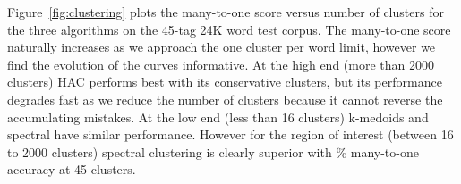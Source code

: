Figure~\ref{fig:clustering} plots the many-to-one score versus number
of clusters for the three algorithms on the 45-tag 24K word test
corpus.  The many-to-one score naturally increases as we approach the
one cluster per word limit, however we find the evolution of the
curves informative.  At the high end (more than 2000 clusters) HAC
performs best with its conservative clusters, but its performance
degrades fast as we reduce the number of clusters because it cannot
reverse the accumulating mistakes.  At the low end (less than 16
clusters) k-medoids and spectral have similar performance.  However
for the region of interest (between 16 to 2000 clusters) spectral
clustering is clearly superior with \spectralResult\% many-to-one
accuracy at 45 clusters.

